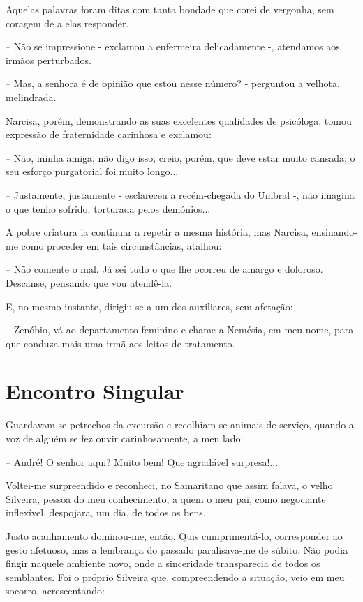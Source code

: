 \documentclass[portuguese,12pt,a4paper]{scrbook}
\begin{document}
	Aquelas palavras foram ditas com tanta bondade que corei de vergonha, sem coragem de a elas responder.
	
	– Não se impressione - exclamou a enfermeira delicadamente -, atendamos aos irmãos perturbados.
	
	– Mas, a senhora é de opinião que estou nesse número? - perguntou a velhota, melindrada.
	
	Narcisa, porém, demonstrando as suas excelentes qualidades de psicóloga, tomou expressão de fraternidade carinhosa e exclamou:
	
	– Não, minha amiga, não digo isso; creio, porém, que deve estar muito cansada; o seu esforço purgatorial foi muito longo...
	
	– Justamente, justamente - esclareceu a recém-chegada do Umbral -, não imagina o que tenho sofrido, torturada pelos demónios...
	
	A pobre criatura ia continuar a repetir a mesma história, mas Narcisa, ensinando-me como proceder em tais circunstâncias, atalhou:
	
	– Não comente o mal. Já sei tudo o que lhe ocorreu de amargo e doloroso. Descanse, pensando que vou atendê-la.
	
	
	E, no mesmo instante, dirigiu-se a um dos auxiliares, sem afetação:
	
	– Zenóbio, vá ao departamento feminino e chame a Nemésia, em meu nome, para que conduza mais uma irmã aos leitos de tratamento.
	
	
	\chapter{Encontro Singular}
	
	Guardavam-se petrechos da excursão e recolhiam-se animais de serviço, quando a voz de alguém se fez ouvir carinhosamente, a meu lado:
	
	– André! O senhor aqui? Muito bem! Que agradável surpresa!...
	
	Voltei-me surpreendido e reconheci, no Samaritano que assim falava, o velho Silveira, pessoa do meu conhecimento, a quem o meu pai, como negociante inflexível, despojara, um dia, de todos os bens.
	
	Justo acanhamento dominou-me, então. Quis cumprimentá-lo, corresponder ao gesto afetuoso, mas a lembrança do passado paralisava-me de súbito. Não podia fingir naquele ambiente novo, onde a sinceridade transparecia de todos os semblantes. Foi o próprio Silveira que, compreendendo a situação, veio em meu socorro, acrescentando:
	
\end{document}
